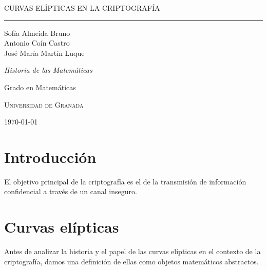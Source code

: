 \documentclass[
  a4paper,
  12pt,
  spanish,
]{scrartcl}
\DeclareRobustCommand{\spacedallcaps}[1]{{\linespread{1.3}\sacshape\MakeTextUppercase{#1}}}%
\newcommand{\horrule}[1]{\rule{\linewidth}{#1}}
\begin{document}
\begin{titlepage}
  \vspace*{4cm}

  \begin{flushleft}
    \Huge
    \spacedallcaps{Curvas Elípticas en la Criptografía}
    \horrule{2pt}
  \end{flushleft}

  \vspace{2em}

  \begin{flushright}
    \large
    Sofía Almeida Bruno\\
    Antonio Coín Castro\\
    José María Martín Luque\vspace{1em}
  
    \textit{Historia de las Matemáticas}
  
    Grado en Matemáticas
  
    \textsc{Universidad de Granada}\vspace{1em}
  
    \today\vspace{.5em}
  \end{flushright}
\end{titlepage}

\newpage

{\hypersetup{hidelinks}
\tableofcontents
}

\newpage

\section{Introducción}

El objetivo principal de la criptografía es el de la transmisión de información confidencial a través de un canal inseguro.


\section{Curvas elípticas}

Antes de analizar la historia y el papel de las curvas elípticas en el contexto de la criptografía, damos una definición de ellas como objetos matemáticos abstractos.
\end{document}
